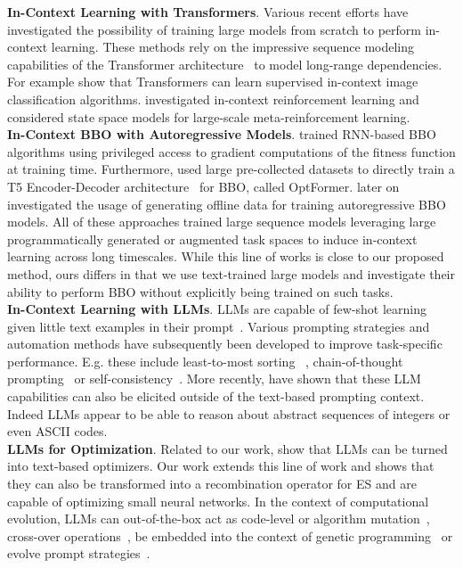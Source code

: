 %
\textbf{In-Context Learning with Transformers}. Various recent efforts have investigated the possibility of training large models from scratch to perform in-context learning. These methods rely on the impressive sequence modeling capabilities of the Transformer architecture~\cite{vaswani2017attention} to model long-range dependencies. For example \citet{kirsch2022general} show that Transformers can learn supervised in-context image classification algorithms. \citet{laskin2022context} investigated in-context reinforcement learning and \citet{lu2023structured} considered state space models for large-scale meta-reinforcement learning. \\
%
\textbf{In-Context BBO with Autoregressive Models}. \citet{chen2017learning} trained RNN-based BBO algorithms using privileged access to gradient computations of the fitness function at training time. Furthermore, \citet{dery2022multi, chen2022towards} used large pre-collected datasets to directly train a T5 Encoder-Decoder architecture~\cite{raffel2020exploring} for BBO, called OptFormer. \citet{krishnamoorthy2022generative} later on investigated the usage of generating offline data for training autoregressive BBO models. All of these approaches trained large sequence models leveraging large programmatically generated or augmented task spaces to induce in-context learning across long timescales.
While this line of works is close to our proposed method, ours differs in that we use text-trained large models and investigate their ability to perform BBO without explicitly being trained on such tasks.\\
%
\textbf{In-Context Learning with LLMs}. LLMs are capable of few-shot learning given little text examples in their prompt~\cite{brown2020language}. Various prompting strategies and automation methods have subsequently been developed to improve task-specific performance. E.g. these include least-to-most sorting ~\cite{zhou2022least}, chain-of-thought prompting~\cite{wei2022chain} or self-consistency~\cite{wang2022self}. More recently, \citet{mirchandani2023large} have shown that these LLM capabilities can also be elicited outside of the text-based prompting context. Indeed LLMs appear to be able to reason about abstract sequences of integers or even ASCII codes.\\
%
\textbf{LLMs for Optimization}. Related to our work, \citet{yang2023large, zhang2023using, nie2023importance} show that LLMs can be turned into text-based optimizers. Our work extends this line of work and shows that they can also be transformed into a recombination operator for ES and are capable of optimizing small neural networks. In the context of computational evolution, LLMs can out-of-the-box act as code-level or algorithm mutation~\cite{chen2023evoprompting, liu2023algorithm}, cross-over operations~\cite{meyerson2023language}, be embedded into the context of genetic programming~\cite{lehman2023evolution} or evolve prompt strategies~\cite{guo2023connecting}. 
